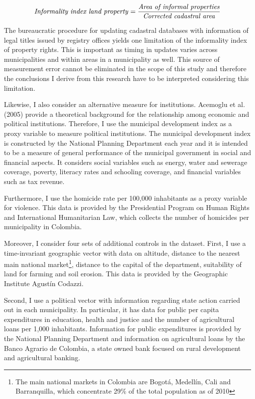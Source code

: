 \documentclass[a4paper, 12pt]{article}
\begin{document}
\[
\text{\emph{Informality index land property}}=\frac{\text{\emph{Area of informal properties}}}{\text{\emph{Corrected cadastral area}}}
\]

The bureaucratic procedure for updating cadastral databases with information of legal titles issued by registry offices yields one limitation of the informality index of property rights. This is important as timing in updates varies across municipalities and within areas in a municipality as well. This source of measurement error cannot be eliminated in the scope of this study and therefore the conclusions I derive from this research have to be interpreted considering this limitation.

Likewise, I also consider an alternative measure for institutions. Acemoglu et al. (2005) provide a theoretical background for the relationship among economic and political institutions. Therefore, I use the municipal development index as a proxy variable to measure political institutions. The municipal development index is constructed by the National Planning Department each year and it is intended to be a measure of general performance of the municipal government in social and financial aspects. It considers social variables such as energy, water and sewerage coverage, poverty, literacy rates and schooling coverage, and financial variables such as tax revenue.

Furthermore, I use the homicide rate per 100,000 inhabitants as a proxy variable for violence. This data is provided by the Presidential Program on Human Rights and International Humanitarian Law, which collects the number of homicides per municipality in Colombia.

Moreover, I consider four sets of additional controls in the dataset. First, I use a time-invariant geographic vector with data on altitude, distance to the nearest main national market\footnote{The main national markets in Colombia are Bogot\'{a}, Medell\'{i}n, Cali and Barranquilla, which concentrate 29\% of the total population as of 2010}, distance to the capital of the department, suitability of land for farming and soil erosion. This data is provided by the Geographic Institute Agust\'{i}n Codazzi.

Second, I use a political vector with information regarding state action carried out in each municipality. In particular, it has data for public per capita expenditures in education, health and justice and the number of agricultural loans per 1,000 inhabitants. Information for public expenditures is provided by the National Planning Department and information on agricultural loans by the Banco Agrario de Colombia, a state owned bank focused on rural development and agricultural banking.
\end{document}
